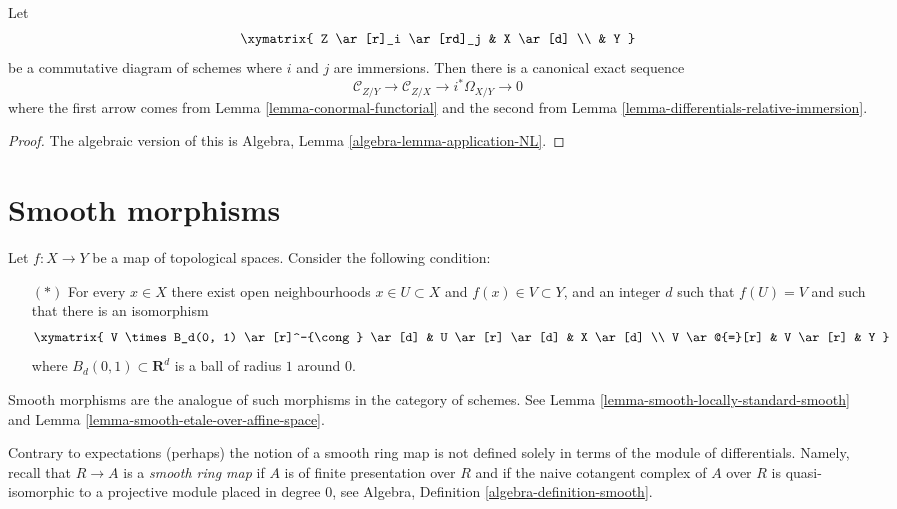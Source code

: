 \begin{lemma}
\label{lemma-two-immersions}
Let
$$
\xymatrix{
Z \ar[r]_i \ar[rd]_j & X \ar[d] \\
& Y
}
$$
be a commutative diagram of schemes where $i$ and $j$ are immersions.
Then there is a canonical exact sequence
$$
\mathcal{C}_{Z/Y} \to
\mathcal{C}_{Z/X} \to
i^*\Omega_{X/Y} \to 0
$$
where the first arrow comes from
Lemma \ref{lemma-conormal-functorial}
and the second from
Lemma \ref{lemma-differentials-relative-immersion}.
\end{lemma}

\begin{proof}
The algebraic version of this is
Algebra, Lemma \ref{algebra-lemma-application-NL}.
\end{proof}










\section{Smooth morphisms}
\label{section-smooth}

\noindent
Let $f : X \to Y$ be a map of topological spaces. Consider the following
condition:
\begin{itemize}
\item[$(*)$] For every $x \in X$ there exist open neighbourhoods
$x \in U \subset X$ and $f(x) \in V \subset Y$, and an integer $d$
such that $f(U) = V$ and such that there is an isomorphism
$$
\xymatrix{
V \times B_d(0, 1) \ar[r]^-{\cong} \ar[d] & U \ar[r] \ar[d] & X \ar[d] \\
V \ar@{=}[r] & V \ar[r] & Y
}
$$
where $B_d(0, 1) \subset \mathbf{R}^d$ is a ball of radius $1$ around $0$.
\end{itemize}
Smooth morphisms are the analogue of such morphisms in the category
of schemes. See
Lemma \ref{lemma-smooth-locally-standard-smooth}
and
Lemma \ref{lemma-smooth-etale-over-affine-space}.

\medskip\noindent
Contrary to expectations (perhaps) the notion
of a smooth ring map is not defined solely in terms
of the module of differentials. Namely, recall that
$R \to A$ is a {\it smooth ring map} if $A$ is of finite presentation over $R$
and if the naive cotangent complex of $A$ over $R$ is quasi-isomorphic
to a projective module placed in degree $0$, see
Algebra, Definition \ref{algebra-definition-smooth}.

